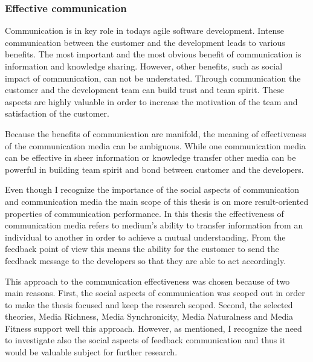 \documentclass[english,12pt,a4paper,pdftex]{article}
\begin{document}
\subsubsection{Effective communication}

Communication is in key role in todays agile software development. Intense communication between the customer and the development leads to various benefits. The most important and the most obvious benefit of communication is information and knowledge sharing. However, other benefits, such as social impact of communication, can not be understated. Through communication the customer and the development team can build trust and team spirit. These aspects are highly valuable in order to increase the motivation of the team and satisfaction of the customer.

Because the benefits of communication are manifold, the meaning of effectiveness of the communication media can be ambiguous. While one communication media can be effective in sheer information or knowledge transfer other media can be powerful in building team spirit and bond between customer and the developers.

Even though I recognize the importance of the social aspects of communication and communication media the main scope of this thesis is on more result-oriented properties of communication performance. In this thesis the effectiveness of communication media refers to medium's ability to transfer information from an individual to another in order to achieve a mutual understanding. From the feedback point of view this means the ability for the customer to send the feedback message to the developers so that they are able to act accordingly.

This approach to the communication effectiveness was chosen because of two main reasons. First, the social aspects of communication was scoped out in order to make the thesis focused and keep the research scoped. Second, the selected theories, Media Richness, Media Synchronicity, Media Naturalness and Media Fitness support well this approach. However, as mentioned, I recognize the need to investigate also the social aspects of feedback communication and thus it would be valuable subject for further research.
\end{document}
